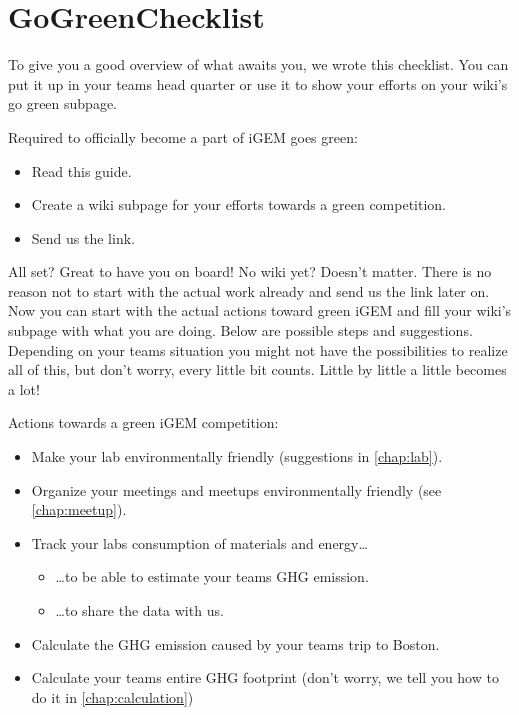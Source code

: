 \section{GoGreenChecklist}\label{checklist}
To give you a good overview of what awaits you, we wrote this checklist. You can put it up in your teams head quarter or use it to show your efforts on your wiki's go green subpage.
\bigskip
{\renewcommand{\labelitemi}{\tickleaf}
\begin{checklistbox}
{\sffamily\textcolor{ocre}{Required to officially become a part of iGEM goes green:}}
\begin{itemize}
	\setlength{\itemsep}{-0.5\parsep}
	\item[\tickleafticked] Read this guide.
	\item Create a wiki subpage for your efforts towards a green competition.%
	\item Send us the link.
\end{itemize}
\end{checklistbox}
\bigskip
All set? Great to have you on board! No wiki yet? Doesn't matter. There is no reason not to start with the actual work already and send us the link later on. Now you can start with the actual actions toward green iGEM and fill your wiki's subpage with what you are doing. Below are possible steps and suggestions. Depending on your teams situation you might not have the possibilities to realize all of this, but don't worry, every little bit counts. Little by little a little becomes a lot!
\bigskip
\begin{checklistbox}
{\sffamily\textcolor{ocre}{Actions towards a green iGEM competition:}}
\begin{itemize}
	\setlength{\itemsep}{-0.5\parsep}
	\item Make your lab environmentally friendly (suggestions in \cref{chap:lab}).
	\item Organize your meetings and meetups environmentally friendly (see \cref{chap:meetup}).
	\item Track your labs consumption of materials and energy\dots
	\begin{itemize}
		\item[] \dots to be able to estimate your teams GHG emission.
		\item[] \dots to share the data with us.
	\end{itemize}
	\item Calculate the GHG emission caused by your teams trip to Boston.
	\item Calculate your teams entire GHG footprint (don't worry, we tell you how to do it in \cref{chap:calculation})

\end{itemize}
\end{checklistbox}}
